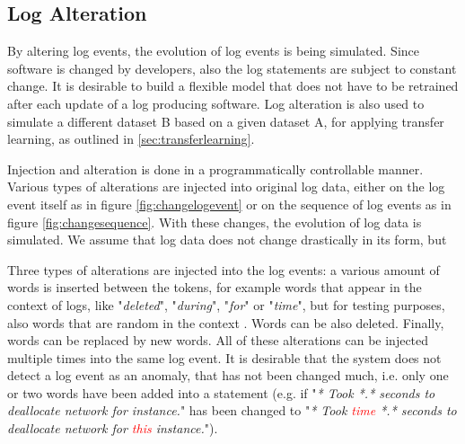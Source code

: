 \subsection{Log Alteration\label{sec:logs_alteration}}
By altering log events, the evolution of log events is being simulated. Since software is changed by developers, also the log statements are subject to constant change. It is desirable to build a flexible model that does not have to be retrained after each update of a log producing software. Log alteration is also used to simulate a different dataset B based on a given dataset A, for applying transfer learning, as outlined in \ref{sec:transferlearning}.

Injection and alteration is done in a programmatically controllable manner. Various types of alterations are injected into original log data, either on the log event itself as in figure \ref{fig:changelogevent} or on the sequence of log events as in figure \ref{fig:changesequence}. With these changes, the evolution of log data is simulated. We assume that log data does not change drastically in its form, but 

Three types of alterations are injected into the log events: a various amount of words is inserted between the tokens, for example words that appear in the context of logs, like "\textit{deleted}", "\textit{during}", "\textit{for}" or "\textit{time}", but for testing purposes, also words that are random in the context . Words can be also deleted. Finally, words can be replaced by new words. All of these alterations can be injected multiple times into the same log event. It is desirable that the system does not detect a log event as an anomaly, that has not been changed much, i.e. only one or two words have been added into a statement (e.g. if "\textit{* Took *.* seconds to deallocate network for instance.}" has been changed to "\textit{* Took \textcolor{red}{time} *.* seconds to deallocate network for \textcolor{red}{this} instance.}").

